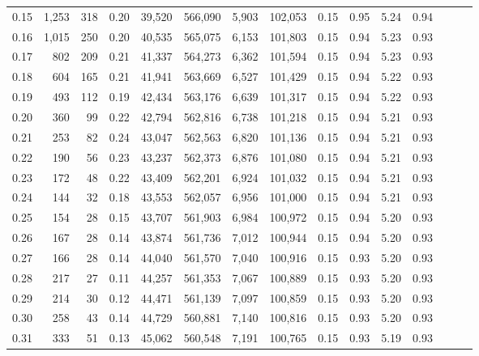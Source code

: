 \begin{tabular}{rrrrrrrrrrrrrrr}
0.15 &   1,253 &     318 &  0.20 &   39,520 &  566,090 &    5,903 &  102,053 &  0.15 &  0.95 &  5.24 &      0.94 \\
0.16 &   1,015 &     250 &  0.20 &   40,535 &  565,075 &    6,153 &  101,803 &  0.15 &  0.94 &  5.23 &      0.93 \\
0.17 &     802 &     209 &  0.21 &   41,337 &  564,273 &    6,362 &  101,594 &  0.15 &  0.94 &  5.23 &      0.93 \\
0.18 &     604 &     165 &  0.21 &   41,941 &  563,669 &    6,527 &  101,429 &  0.15 &  0.94 &  5.22 &      0.93 \\
0.19 &     493 &     112 &  0.19 &   42,434 &  563,176 &    6,639 &  101,317 &  0.15 &  0.94 &  5.22 &      0.93 \\
0.20 &     360 &      99 &  0.22 &   42,794 &  562,816 &    6,738 &  101,218 &  0.15 &  0.94 &  5.21 &      0.93 \\
0.21 &     253 &      82 &  0.24 &   43,047 &  562,563 &    6,820 &  101,136 &  0.15 &  0.94 &  5.21 &      0.93 \\
0.22 &     190 &      56 &  0.23 &   43,237 &  562,373 &    6,876 &  101,080 &  0.15 &  0.94 &  5.21 &      0.93 \\
0.23 &     172 &      48 &  0.22 &   43,409 &  562,201 &    6,924 &  101,032 &  0.15 &  0.94 &  5.21 &      0.93 \\
0.24 &     144 &      32 &  0.18 &   43,553 &  562,057 &    6,956 &  101,000 &  0.15 &  0.94 &  5.21 &      0.93 \\
0.25 &     154 &      28 &  0.15 &   43,707 &  561,903 &    6,984 &  100,972 &  0.15 &  0.94 &  5.20 &      0.93 \\
0.26 &     167 &      28 &  0.14 &   43,874 &  561,736 &    7,012 &  100,944 &  0.15 &  0.94 &  5.20 &      0.93 \\
0.27 &     166 &      28 &  0.14 &   44,040 &  561,570 &    7,040 &  100,916 &  0.15 &  0.93 &  5.20 &      0.93 \\
0.28 &     217 &      27 &  0.11 &   44,257 &  561,353 &    7,067 &  100,889 &  0.15 &  0.93 &  5.20 &      0.93 \\
0.29 &     214 &      30 &  0.12 &   44,471 &  561,139 &    7,097 &  100,859 &  0.15 &  0.93 &  5.20 &      0.93 \\
0.30 &     258 &      43 &  0.14 &   44,729 &  560,881 &    7,140 &  100,816 &  0.15 &  0.93 &  5.20 &      0.93 \\
0.31 &     333 &      51 &  0.13 &   45,062 &  560,548 &    7,191 &  100,765 &  0.15 &  0.93 &  5.19 &      0.93 \\

\end{tabular}
